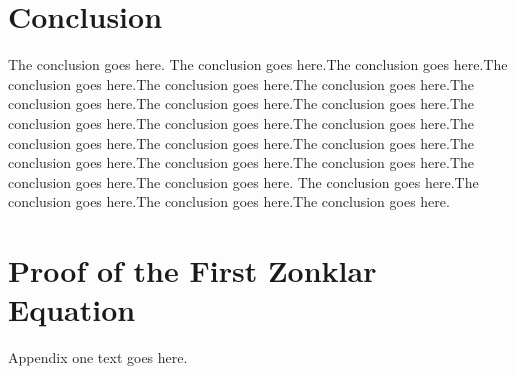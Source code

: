 \documentclass[10pt,journal,cspaper,compsoc]{IEEEtran}
\begin{document}
\section{Conclusion}
The conclusion goes here. The conclusion goes here.The conclusion goes here.The conclusion goes here.The conclusion goes here.The conclusion goes here.The conclusion goes here.The conclusion goes here.The conclusion goes here.The conclusion goes here.The conclusion goes here.The conclusion goes here.The conclusion goes here.The conclusion goes here.The conclusion goes here.The conclusion goes here.The conclusion goes here.The conclusion goes here.The conclusion goes here.The conclusion goes here. The conclusion goes here.The conclusion goes here.The conclusion goes here.The conclusion goes here.






%


\appendices
\section{Proof of the First Zonklar Equation}
Appendix one text goes here.

\end{document}
